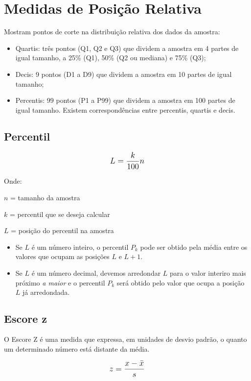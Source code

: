 \section{Medidas de Posição Relativa}

Mostram pontos de corte na distribuição relativa dos dados da amostra:

\begin{itemize}
	\item Quartis: três pontos (Q1, Q2 e Q3) que dividem a amostra em 4 partes de igual tamanho, a 25\% (Q1), 50\% (Q2 ou mediana) e 75\% (Q3);
	\item Decis: 9 pontos (D1 a D9) que dividem a amostra em 10 partes  de igual tamanho;
	\item Percentis: 99 pontos (P1 a P99) que dividem a amostra em 100 partes  de igual tamanho. Existem correspondências entre percentis, quartis e decis.
\end{itemize}

\subsection{Percentil}

\[\beq{ L = \frac{k}{100}n }\]

Onde:

\(n\) = tamanho da amostra

\(k\) = percentil que se deseja calcular	

\(L\) = posição do percentil na amostra

\begin{itemize}
    \item Se \(L\) é um número inteiro, o percentil \(P_k\) pode ser obtido pela média 			entre os valores que ocupam as posições \(L\) e \(L+1\).
    \item Se \(L\) é um número decimal, devemos arredondar \(L\) para o valor interiro 			mais próximo \emph{a maior} e o percentil \(P_k\) será obtido pelo valor que ocupa a 		posição \(L\) já arredondada.      
\end{itemize}

\subsection{Escore z}

O Escore Z é uma medida que expressa, em unidades de desvio padrão, o quanto um determinado número está distante da média.

\[\beq{ z = \frac{x-\bar{x}}{s} }\]

